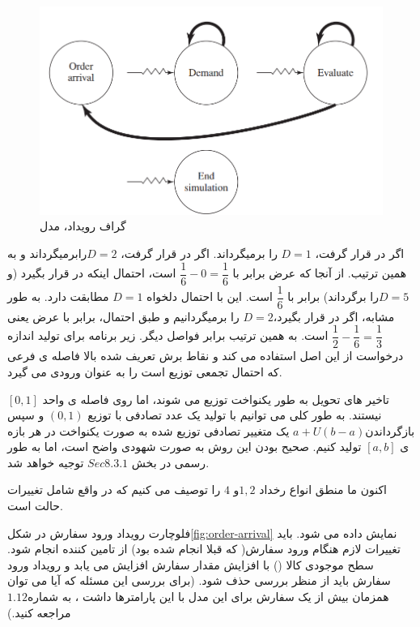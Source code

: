 \documentclass[12pt,a4paper]{report}
\begin{document}
\begin{center}
	\begin{figure}[hpt]
		\centering
		\includegraphics[width=1\textwidth]{Figures/29.png}\hfill
		\caption{گراف رویداد، مدل  }
		\label{شکل 29}
	\end{figure}
\end{center}

اگر  در  قرار گرفت، $D = 1 $ را برمیگرداند. اگر    در  قرار گرفت، $ D=2 $رابرمیگرداند و به همین ترتیب. از آنجا که عرض  برابر با 
$\dfrac{1}{6}-0 = \dfrac{1}{6}$ 
است، احتمال اینکه  در  قرار بگیرد (و$ D=5 $را برگرداند)  برابر با $\dfrac{1}{6}$   است. این با احتمال دلخواه $ D=1 $ مطابقت دارد. به طور مشابه، اگر  در  قرار بگیرد،$ D=2 $ را برمیگردانیم و طبق احتمال، برابر با عرض  یعنی 
$\dfrac{1}{2}-\dfrac{1}{6} = \dfrac{1}{3}$
است. به همین ترتیب برابر فواصل دیگر.  زیر برنامه برای تولید اندازه درخواست از این اصل استفاده می کند و نقاط برش تعریف شده بالا فاصله ی فرعی که احتمال تجمعی توزیع  است را به عنوان ورودی می گیرد.

تاخیر های تحویل به طور یکنواخت توزیع می شوند، اما روی فاصله ی واحد $[0,1] $ نیستند. به طور کلی می توانیم با تولید یک عدد تصادفی با توزیع  $(0,1)$ و سپس بازگرداندن$ a+U(b-a)$ یک متغییر تصادفی توزیع شده به صورت یکنواخت در هر بازه ی $[a,b] $ تولید کنیم. صحیح بودن این روش به صورت شهودی واضح است، اما به طور رسمی در بخش $Sec 8.3.1 $ توجیه خواهد شد.

اکنون ما منطق انواع رخداد $ 1,2 $و $4 $ را توصیف می کنیم که در واقع شامل تغییرات حالت است.

فلوچارت رویداد ورود سفارش در شکل\ref{fig:order-arrival} نمایش داده می شود. باید تغییرات لازم هنگام ورود سفارش( که قبلا انجام شده بود) از تامین کننده انجام شود. سطح موجودی کالا () با افزایش مقدار سفارش افزایش می یابد و رویداد ورود سفارش باید از منظر بررسی حذف شود. (برای بررسی این مسئله که آیا می توان همزمان بیش از یک سفارش برای این مدل با این پارامترها داشت ، به شماره$ 1.12$ مراجعه کنید.)
\end{document}
